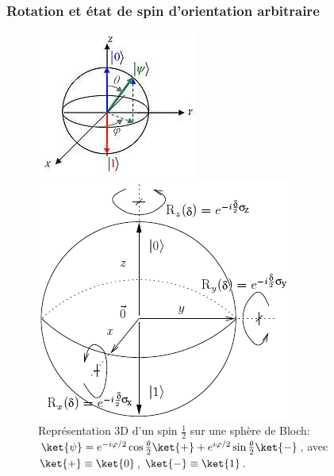 \subsubsection{Rotation et état de spin d'orientation arbitraire}
\label{sec:SpinArbitr1}

\begin{figure}[ptbh]
\begin{minipage}[c]{.45\linewidth}
\centering
  \includegraphics[scale=1]{graphics/SphereBloch.jpg}
\caption{Représentation 3D d'un spin $\frac{1}{2}$ sur une sphère de Bloch:
$\ket{\psi} =e^{-i\varphi/2}\cos\frac{\theta}{2}\ket{+}
+e^{i\varphi/2}\sin\frac{\theta}{2}\ket{-}$, avec $\ket{+}\equiv\ket{0}$,
$\ket{-}\equiv\ket{1}$.}
\label{fig:ReprSpin12Bloch}
\end{minipage} \hfill
\begin{minipage}[c]{.48\linewidth}
\centering
\ifcase\msipdfoutput
  \includegraphics[scale=.7]{graphics/SphereBloch2.png}
\else

\end{minipage}
\end{figure}
